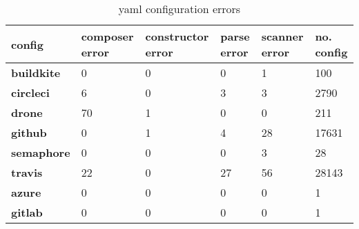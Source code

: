 \begin {table}[!htbp]

\caption{yaml configuration errors}
\label{table_yaml_errors}
\begin{tabular}{|l|l|l|l|l|l|}
\hline
\textbf{config} &  composer error &  constructor error &  parse error &  scanner error &  no. config \\ \hline

\textbf{buildkite} &               0 &                  0 &            0 &              1 &         100 \\ \hline
\textbf{circleci } &               6 &                  0 &            3 &              3 &        2790 \\ \hline
\textbf{drone    } &              70 &                  1 &            0 &              0 &         211 \\ \hline
\textbf{github   } &               0 &                  1 &            4 &             28 &       17631 \\ \hline
\textbf{semaphore} &               0 &                  0 &            0 &              3 &          28 \\ \hline
\textbf{travis   } &              22 &                  0 &           27 &             56 &       28143 \\ \hline
\textbf{azure    } &               0 &                  0 &            0 &              0 &           1 \\ \hline
\textbf{gitlab   } &               0 &                  0 &            0 &              0 &           1 \\ \hline

\end{tabular}
\end{table}
